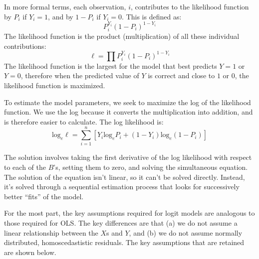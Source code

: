 \documentclass[11pt,openany]{book}\usepackage[]{graphicx}\usepackage[]{color}
\begin{document}
{In more formal terms, each observation, $i$,  contributes to the likelihood function by $P_i$ if $Y_i=1$, and by $1-P_i$ if $Y_i=0$. This is defined as: 
\begin{equation*}
  P^{Y_{i}}_i(1-P_i)^{1-Y_i}
\end{equation*}
\noindent The likelihood function is the product (multiplication) of all these individual contributions:
\begin{equation*}
  \ell = \prod P^{Y_{i}}_i(1-P_i)^{1-Y_i}
\end{equation*}
\noindent The likelihood function is the largest for the model that best predicts $Y=1$ or $Y=0$, therefore when the predicted value of $Y$ is correct and close to $1$ or $0$, the likelihood function is maximized. 

To estimate the model parameters, we seek to maximize the log of the likelihood function. We use the log because it converts the multiplication into addition, and is therefore easier to calculate. The log likelihood is:
\begin{equation*}
  \text{log}_e \ell = \sum^{n}_{i=1}[Y_i \text{log}_e P_i+(1-Y_i)\text{log}_e(1-P_i)]
\end{equation*}

The solution involves taking the first derivative of the log likelihood with respect to each of the $B$’s, setting them to zero, and solving the simultaneous equation.  The solution of the equation isn't linear, so it can't be solved directly.  Instead, it's solved through a sequential estimation process that looks for successively better ``fits'' of the model. 

For the most part, the key assumptions required for logit models are analogous to those required for OLS. The key differences are that (a) we do not assume a linear relationship between the $X$s and $Y$, and (b) we do not assume normally distributed, homoscedastistic residuals. The key assumptions that are retained are shown below.

}
\end{document}
